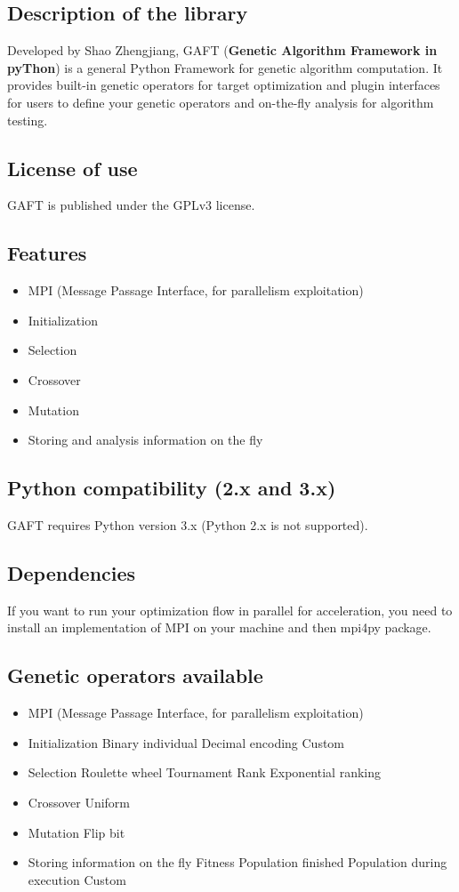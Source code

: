 \documentclass{article}
\begin{document}
\subsection{Description of the library}
Developed by Shao Zhengjiang, GAFT (\textbf{Genetic Algorithm Framework in pyThon}) is a general Python Framework for genetic algorithm computation. It provides built-in genetic operators for target optimization and plugin interfaces for users to define your genetic operators and on-the-fly analysis for algorithm testing.
\subsection{License of use}
GAFT is published under the GPLv3 license.
\subsection{Features}
 \begin{itemize}
     \item MPI (Message Passage Interface, for parallelism exploitation)
     \item Initialization
     \item Selection
     \item Crossover
    \item Mutation
    \item Storing and analysis information on the fly
 \end{itemize}
\subsection{Python compatibility (2.x and 3.x)}
GAFT requires Python version 3.x (Python 2.x is not supported).
\subsection{Dependencies}
If you want to run your optimization flow in parallel for acceleration, you need to install an implementation of MPI on your machine and then mpi4py package.
\subsection{Genetic operators available}
 \begin{itemize}
     \item MPI (Message Passage Interface, for parallelism exploitation)
     \item Initialization
     \subitem Binary individual
     \subitem Decimal encoding
     \subitem Custom
     \item Selection
     \subitem Roulette wheel 
     \subitem Tournament
     \subitem Rank
     \subitem Exponential ranking 
     \item Crossover
     \subitem Uniform 
    \item Mutation
    \subitem Flip bit
    \item Storing information on the fly
    \subitem Fitness
    \subitem Population finished
    \subitem Population during execution
    \subitem Custom
 \end{itemize}
\end{document}
